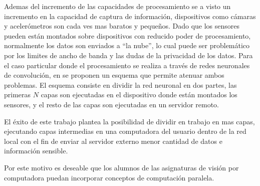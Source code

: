 Ademas del incremento de las capacidades de procesamiento se a visto un
incremento en la capacidad de captura de información, dispositivos como cámaras
y acelerómetros son cada ves mas baratos y pequeños. Dado que los sensores
pueden están montados sobre dispositivos con reducido poder de procesamiento,
normalmente los datos son enviados a ``la nube'', lo cual puede ser problemático
por los limites de ancho de banda y las dudas de la privacidad de los datos.
Para el caso particular donde el procesamiento se realiza a través de redes
neuronales de convolución, en \cite{pipelinebasedCaffe2017} se proponen un
esquema que permite atenuar ambos problemas. El esquema consiste en dividir la
red neuronal en dos partes, las primeras $N$ capas son ejecutadas en el
dispositivo donde están montados los sensores, y el resto de las capas son
ejecutadas en un servidor remoto.

El éxito de este trabajo plantea la posibilidad de dividir en trabajo en mas
capas, ejecutando capas intermedias en una computadora del usuario dentro de la
red local con el fin de enviar al servidor externo menor cantidad de datos e
información sensible.

Por este motivo es deseable que los alumnos de las asignaturas de visión por
computadora puedan incorporar conceptos de computación paralela.
